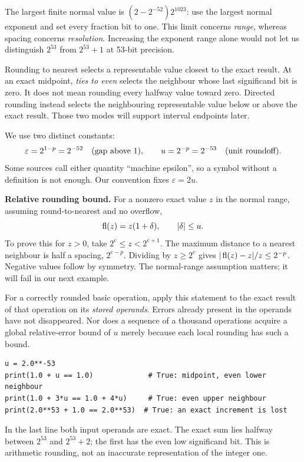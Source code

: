 The largest finite normal value is $(2-2^{-52})2^{1023}$: use the largest
normal exponent and set every fraction bit to one. This limit concerns
\emph{range}, whereas spacing concerns \emph{resolution}. Increasing the exponent
range alone would not let us distinguish $2^{53}$ from $2^{53}+1$ at 53-bit precision.

\newpage
{}
Rounding to nearest selects a representable value closest to the exact result.
At an exact midpoint, \emph{ties to even} selects the neighbour whose last
significand bit is zero. It does not mean rounding every halfway value toward zero.
Directed rounding instead selects the neighbouring representable value below
or above the exact result. Those two modes will support interval endpoints later.

We use two distinct constants:
\[
 \varepsilon=2^{1-p}=2^{-52}\quad\hbox{(gap above 1)},\qquad
 u=2^{-p}=2^{-53}\quad\hbox{(unit roundoff)}.
\]
Some sources call either quantity ``machine epsilon'', so a symbol without a
definition is not enough. Our convention fixes $\varepsilon=2u$.

\textbf{Relative rounding bound.} For a nonzero exact value $z$ in the normal
range, assuming round-to-nearest and no overflow,
\[
 \operatorname{fl}(z)=z(1+\delta),\qquad |\delta|\le u.
\]
To prove this for $z>0$, take $2^e\le z<2^{e+1}$. The maximum distance to
a nearest neighbour is half a spacing, $2^{e-p}$. Dividing by
$z\ge2^e$ gives $|\operatorname{fl}(z)-z|/z\le2^{-p}$. Negative values follow by symmetry.
The normal-range assumption matters; it will fail in our next example.

For a correctly rounded basic operation, apply this statement to the exact result
of that operation on its \emph{stored operands}. Errors already present in the operands
have not disappeared. Nor does a sequence of a thousand operations acquire a
global relative-error bound of $u$ merely because each local rounding has such a bound.

\begin{lstlisting}
u = 2.0**-53
print(1.0 + u == 1.0)             # True: midpoint, even lower neighbour
print(1.0 + 3*u == 1.0 + 4*u)     # True: even upper neighbour
print(2.0**53 + 1.0 == 2.0**53)  # True: an exact increment is lost
\end{lstlisting}
In the last line both input operands are exact. The exact sum lies halfway
between $2^{53}$ and $2^{53}+2$; the first has the even low significand bit.
This is arithmetic rounding, not an inaccurate representation of the integer one.

